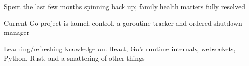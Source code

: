 \item Spent the last few months spinning back up; family health matters fully resolved
\item Current Go project is launch-control, a goroutine tracker and ordered shutdown manager
\item Learning/refreshing knowledge on: React, Go's runtime internals, websockets,
      Python, Rust, and a smattering of other things


